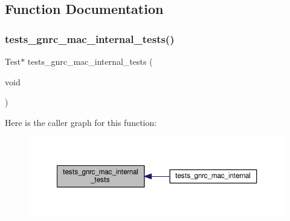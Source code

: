 \subsection{Function Documentation}
\mbox{\label{tests-gnrc__mac__internal_8c_a0716be01eaf3a53eadb1b5bf0bb9be24}} 
\subsubsection{\texorpdfstring{tests\+\_\+gnrc\+\_\+mac\+\_\+internal\+\_\+tests()}{tests\_gnrc\_mac\_internal\_tests()}}
{\footnotesize\ttfamily Test$\ast$ tests\+\_\+gnrc\+\_\+mac\+\_\+internal\+\_\+tests (\begin{DoxyParamCaption}\item[{void}]{ }\end{DoxyParamCaption})}

Here is the caller graph for this function\+:
\nopagebreak
\begin{figure}[H]
\begin{center}
\leavevmode
\includegraphics[width=350pt]{tests-gnrc__mac__internal_8c_a0716be01eaf3a53eadb1b5bf0bb9be24_icgraph}
\end{center}
\end{figure}
